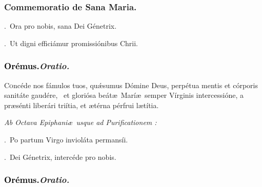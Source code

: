 \documentclass[12pt]{article} %
\newenvironment{rubric}{\color{benred8} \itshape \leftskip 0in \setlength{\parindent}{0.25in}}{\vspace{2 mm}}
\newenvironment{response}{\leftskip 0in \setlength{\parindent}{0in}}{\vspace{2 mm}}
\let\oldgresixstar\gresixstar
\renewcommand{\gresixstar}{\textcolor{benred8}{\oldgresixstar}}
\let\oldVbar\Vbar
\renewcommand{\Vbar}{\textcolor{benred8}{\oldVbar .}}
\let\oldRbar\Rbar
\renewcommand{\Rbar}{\textcolor{benred8}{\oldRbar .}}
\def\capitulumSpace{\hspace{20 mm}}
\begin{document}

\subsubsection*{Commemoratio de Sana Maria.}


\gresetfirstlineaboveinitial{\small \textsc{ \textbf{\textcolor{benred8}{I}}}}{\small \textsc{ \textbf{\textcolor{benred8}{I}}}}

\begin{response}
\Vbar\ Ora pro nobis, sana Dei G\'{e}netrix.

\Rbar\ Ut digni effici\'{a}mur promissi\'{o}nibus Chrii.

\end{response}

\subsubsection*{\textcolor{black}{Or\'{e}mus.}\capitulumSpace \emph{Oratio.}}

\begin{response}\lettrine{C}{o}nc\'{e}de nos f\'{a}mulos tuos, qu\'{\ae}sumus D\'{o}mine Deus, perp\'{e}tua mentis et c\'{o}rporis sanit\'{a}te gaud\'{e}re, \gresixstar\ et glori\'{o}sa be\'{a}t\ae\ Mar\'{i}\ae\ semper V\'{i}rginis intercessi\'{o}ne, a pr\ae s\'{e}nti liber\'{a}ri tri\'{i}tia, et \ae t\'{e}rna p\'{e}rfrui l\ae t\'{i}tia.

\end{response}

\begin{rubric}
Ab Octava Epiphani\ae\ usque ad Purificationem :

\end{rubric}

\begin{response}
\Vbar\ Po partum Virgo inviol\'{a}ta permans\'{i}i.

\Rbar\ Dei G\'{e}netrix, interc\'{e}de pro nobis.

\end{response}

\subsubsection*{\textcolor{black}{Or\'{e}mus.}\capitulumSpace \emph{Oratio.}}
\end{document}
